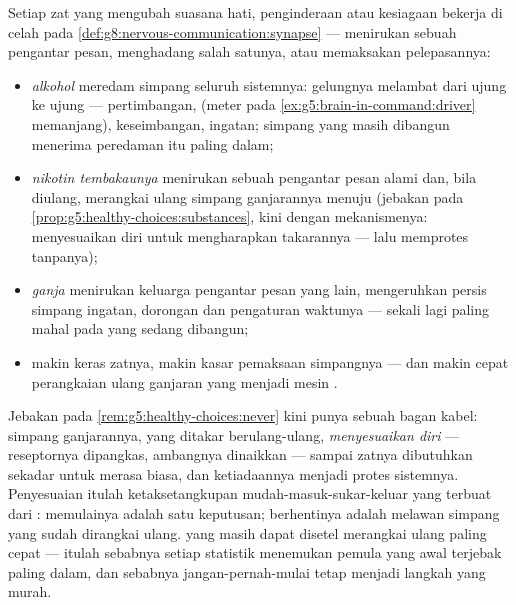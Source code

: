 \begin{proposition}\label{prop:g8:protecting-the-nervous-system:substances}
Setiap zat yang mengubah suasana hati, penginderaan atau
kesiagaan bekerja di celah pada
\cref{def:g8:nervous-communication:synapse} --- menirukan
sebuah pengantar pesan, menghadang salah satunya, atau
memaksakan pelepasannya:
\begin{itemize}
  \item \emph{alkohol} meredam simpang seluruh sistemnya:
        gelungnya melambat dari ujung ke ujung ---
        pertimbangan,  (meter pada
        \cref{ex:g5:brain-in-command:driver} memanjang),
        keseimbangan, ingatan; simpang   yang
        masih dibangun menerima peredaman itu paling dalam;
  \item \emph{nikotin tembakaunya} menirukan sebuah
        pengantar pesan alami dan, bila diulang, merangkai
        ulang simpang ganjarannya menuju \emph{}
        (jebakan pada \cref{prop:g5:healthy-choices:substances},
        kini dengan mekanismenya:  menyesuaikan
        diri untuk mengharapkan takarannya --- lalu
        memprotes tanpanya);
  \item \emph{ganja} menirukan keluarga pengantar pesan yang
        lain, mengeruhkan persis simpang ingatan, dorongan
        dan pengaturan waktunya --- sekali lagi paling mahal
        pada  yang sedang dibangun;
  \item makin keras zatnya, makin kasar pemaksaan simpangnya
        --- dan makin cepat perangkaian ulang ganjaran yang
        menjadi mesin .
\end{itemize}
\end{proposition}
\admitted

\begin{remark}\label{rem:g8:protecting-the-nervous-system:addiction}
Jebakan pada \cref{rem:g5:healthy-choices:never} kini punya
sebuah bagan kabel: simpang ganjarannya, yang ditakar
berulang-ulang, \emph{menyesuaikan diri} --- reseptornya
dipangkas, ambangnya dinaikkan --- sampai zatnya dibutuhkan
sekadar untuk merasa biasa, dan ketiadaannya menjadi protes
sistemnya. Penyesuaian itulah ketaksetangkupan
mudah-masuk-sukar-keluar yang terbuat dari :
memulainya adalah satu keputusan; berhentinya adalah melawan
simpang yang sudah dirangkai ulang.   yang masih
dapat disetel merangkai ulang paling cepat --- itulah
sebabnya setiap statistik menemukan pemula yang awal
terjebak paling dalam, dan sebabnya jangan-pernah-mulai
tetap menjadi langkah yang murah.
\end{remark}

